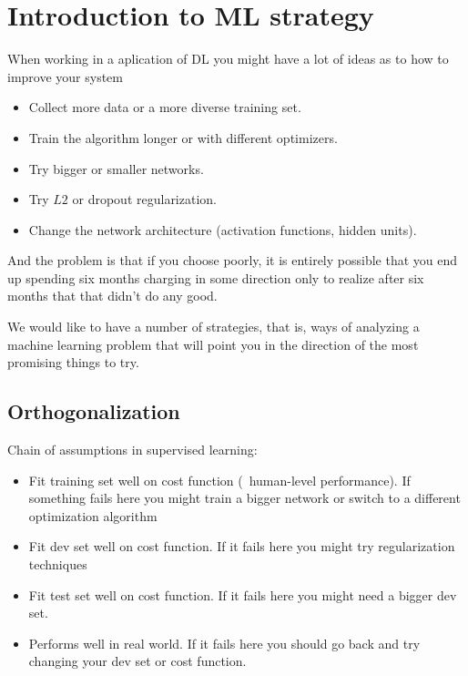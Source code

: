 




\section*{Introduction to ML strategy}

When working in a aplication of DL you might have a lot of ideas as to how to improve 
your system

\begin{itemize}
    \item Collect more data or a more diverse training set.
    \item Train the algorithm longer or with different optimizers.
    \item Try bigger or smaller networks.
    \item Try $L2$ or dropout regularization.
    \item Change the network architecture (activation functions, hidden units).
\end{itemize}

And the problem is that if you choose poorly, it is entirely possible that you end up 
spending six months charging in some direction only to realize after six months that
that didn't do any good.

We would like to have a number of strategies, that is, ways of analyzing a machine 
learning problem that will point you in the direction of the most promising things 
to try.

\subsection*{Orthogonalization}

Chain of assumptions in supervised learning:
\begin{itemize}
    \item Fit training set well on cost function (~human-level performance). If something
    fails here you might train a bigger network or switch to a different optimization 
    algorithm
    \item Fit dev set well on cost function. If it fails here you might try regularization 
    techniques
    \item Fit test set well on cost function. If it fails here you might need a bigger dev set.
    \item Performs well in real world. If it fails here you should go back and try
    changing your dev set or cost function.
\end{itemize}

